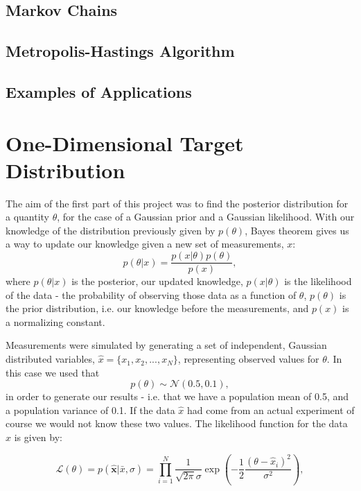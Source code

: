 \documentclass[a4paper,11pt,twoside]{article}
\begin{document}
\subsection{Markov Chains} 
\subsection{Metropolis-Hastings Algorithm}
\subsection{Examples of Applications}

\section{One-Dimensional Target Distribution} 
The aim of the first part of this project was to find the posterior distribution
for a quantity $\theta$, for the case of a Gaussian prior and a Gaussian
likelihood. With our knowledge of the distribution previously given by
$p(\theta)$, Bayes theorem gives us a way to update our knowledge given a new
set of measurements, $x$: 
\begin{equation}
	\label{eq:bayes}
	p(\theta|x) = \frac{p(x|\theta)p(\theta)}{p(x)},
\end{equation} 
where $p(\theta|x)$ is the posterior, our updated knowledge, $p(x|\theta)$ is
the likelihood of the data - the probability of observing those data as a
function of $\theta$, $p(\theta)$ is the prior distribution, i.e. our knowledge
before the measurements, and $p(x)$ is a normalizing constant.

Measurements were simulated by generating a set of independent, Gaussian
distributed variables, $\hat{x} = \{x_1, x_2, ..., x_N\}$, representing observed
values for $\theta$. In this case we used that
\begin{equation}
	\label{eq:measurements}
	p(\theta) \sim \mathcal{N}(0.5, 0.1),
\end{equation}
in order to generate our results - i.e. that we have a population mean of 0.5,
and a population variance of 0.1. If the data $\hat{x}$ had come from an actual
experiment of course we would not know these two values.
The likelihood function for the data $\hat{x}$ is given by:

\begin{equation}
	\label{eq:rawlikelihood}
	\mathcal{L}(\theta) = p(\hat{\mathbf{x}}|\bar{x},\sigma) = \prod_{i=1}^{N} \frac{1}{\sqrt{2\pi}\sigma}\exp\left(-\frac{1}{2}\frac{(\theta - \hat{x}_i)^2}{\sigma^2}\right),
\end{equation}
\end{document}
